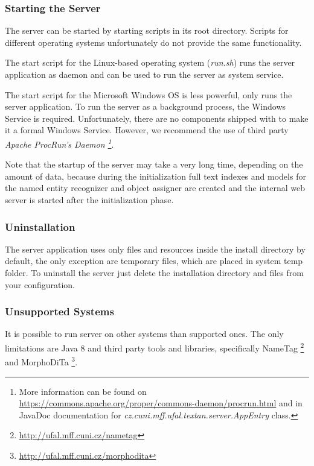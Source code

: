 

\subsubsection{Starting the Server}

The server can be started by starting scripts in its root directory. Scripts for
different operating systems unfortunately do not provide the same functionality.

The start script for the Linux-based operating system (\emph{run.sh}) runs the
server application as daemon and can be used to run the server as system service.

The start script for the Microsoft Windows OS is less powerful, only runs the
server application. To run the server as a background process, the Windows
Service is required. Unfortunately, there are no components shipped with
\textan{} to make it a formal Windows Service. However, we recommend the use of
third party \emph{Apache ProcRun's Daemon \footnote{More information can be
found on \url{https://commons.apache.org/proper/commons-daemon/procrun.html}
and in JavaDoc documentation for \emph{cz.cuni.mff.ufal.textan.server.AppEntry}
class.}}.

Note that the startup of the server may take a very long time, depending on the
amount of data, because during the initialization full text indexes
and models for the named entity recognizer and object assigner are created and
the internal web server is started after the initialization phase.

\subsubsection{Uninstallation}
The server application uses only files and resources inside the install
directory by default, the only exception are temporary files, which are placed
in system temp folder. To uninstall the server just delete the installation directory and files from your configuration.

\subsubsection{Unsupported Systems}
\label{sssec:unsupport}
It is possible to run \textan{} server on other systems than supported ones.
The only limitations are Java 8 and third party tools and libraries,
specifically NameTag%
\footnote{\url{http://ufal.mff.cuni.cz/nametag}} and MorphoDiTa%
\footnote{\url{http://ufal.mff.cuni.cz/morphodita}}.

